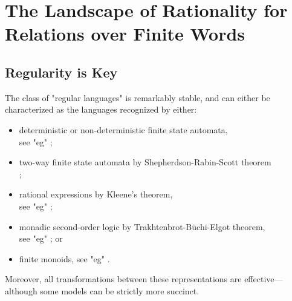 \section{The Landscape of Rationality for Relations over Finite Words}
\label{sec:preliminaries-automatic-structures-relations}

\subsection{Regularity is Key}

The class of "regular languages" is remarkably stable, and can either be characterized as the 
languages recognized by either:
\begin{itemize}
	\item deterministic or non-deterministic finite state automata,\\
		\null\hspace{1.0pc}see "eg" \cite[Proposition~1.2.3, p.~7]{Pin2021FiniteAutomata};
	\item two-way finite state automata by Shepherdson-Rabin-Scott theorem\\
		\null\hspace{1.0pc}\cite[Theorem~2, p.~198]{Shepherdson1959ReductionTwoWay}
		\cite[Theorem~15, p.~123]{RabinScott1959FiniteAutomata};
	\item rational expressions by Kleene's theorem,\\
		\null\hspace{1.0pc}see "eg" \cite[Theorem~1.5.11, p.~34]{Pin2021FiniteAutomata};
	\item monadic second-order logic by Trakhtenbrot-Büchi-Elgot theorem,\\
		\null\hspace{1.0pc}see "eg" \cite[Theorem~2.2, p.~32]{Bojanczyk2020MSO}; or
	\item finite monoids, see "eg" \cite[\S~1.4.2, p.~19]{Pin2021FiniteAutomata}.
\end{itemize}
Moreover, all transformations between these representations are effective---although some
models can be strictly more succinct.

